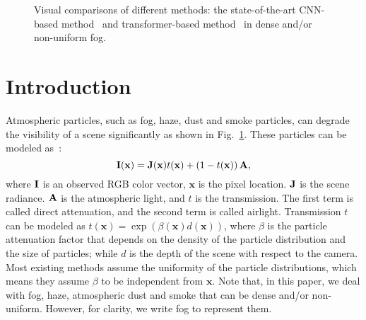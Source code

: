 \documentclass[runningheads]{llncs}
\newcommand{\bfx}{{\bf x}}
\newcommand{\bfI}{{\bf I}}
\newcommand{\bfJ}{{\bf J}}
\newcommand{\bfA}{{\bf A}}
\begin{document}
\begin{figure}[t]
	\centering
		\captionsetup[subfloat]{labelformat=empty}
		\captionsetup[subfloat]{farskip=2pt}
		\setcounter{subfigure}{0}
		\hfill
		\hfill
		\hfill
		\hfill
	\caption{Visual comparisons of different methods: the state-of-the-art CNN-based method~\cite{yang2022self} and transformer-based method~\cite{guo2022image} in dense and/or non-uniform fog.}
	\label{fig:intro}
\end{figure}

\section{Introduction}
\label{sec:intro}
Atmospheric particles, such as fog, haze, dust and smoke particles, can degrade the visibility of a scene significantly as shown in Fig.~\ref{fig:intro}.
These particles can be modeled as~\cite{koschmieder1924theorie}:
\begin{equation}
	\bfI(\bfx) = \bfJ(\bfx)t(\bfx) + \left(1-t(\bfx)\right)\bfA,
	\label{eq:asmodel}
\end{equation}
where $\bfI$ is an observed RGB color vector, $\mathbf{x}$ is the pixel location. $\bfJ$ is the scene radiance. $\bfA$ is the atmospheric light, and $t$ is the transmission. 
The first term is called direct attenuation, and the second term is called airlight. 
Transmission $t$ can be modeled as $t(\mathbf{x}) = \exp(\beta(\mathbf{x}) d(\mathbf{x}))$, 
where $\beta$ is the particle attenuation factor that depends on the density of the particle distribution and the size of particles;
while $d$ is the depth of the scene with respect to the camera. 
Most existing methods assume the uniformity of the particle distributions, which means they assume $\beta$ to be independent from $\mathbf{x}$.
Note that, in this paper, we deal with fog, haze, atmospheric dust and smoke that can be dense and/or non-uniform. However, for clarity, we write fog to represent them.
\end{document}
